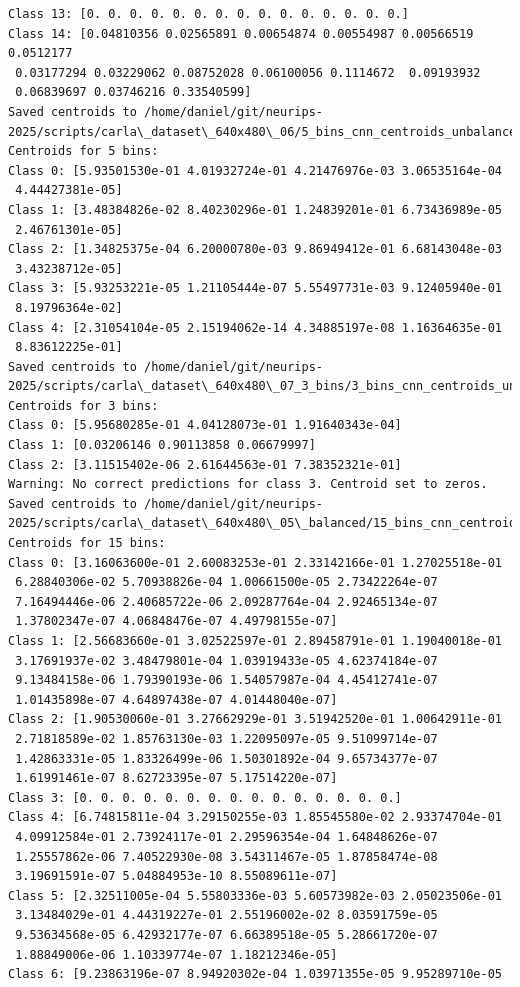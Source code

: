 \begin{verbatim}
Class 13: [0. 0. 0. 0. 0. 0. 0. 0. 0. 0. 0. 0. 0. 0. 0.]
Class 14: [0.04810356 0.02565891 0.00654874 0.00554987 0.00566519 0.0512177
 0.03177294 0.03229062 0.08752028 0.06100056 0.1114672  0.09193932
 0.06839697 0.03746216 0.33540599]
Saved centroids to /home/daniel/git/neurips-2025/scripts/carla\_dataset\_640x480\_06/5_bins_cnn_centroids_unbalanced.npy
Centroids for 5 bins:
Class 0: [5.93501530e-01 4.01932724e-01 4.21476976e-03 3.06535164e-04
 4.44427381e-05]
Class 1: [3.48384826e-02 8.40230296e-01 1.24839201e-01 6.73436989e-05
 2.46761301e-05]
Class 2: [1.34825375e-04 6.20000780e-03 9.86949412e-01 6.68143048e-03
 3.43238712e-05]
Class 3: [5.93253221e-05 1.21105444e-07 5.55497731e-03 9.12405940e-01
 8.19796364e-02]
Class 4: [2.31054104e-05 2.15194062e-14 4.34885197e-08 1.16364635e-01
 8.83612225e-01]
Saved centroids to /home/daniel/git/neurips-2025/scripts/carla\_dataset\_640x480\_07_3_bins/3_bins_cnn_centroids_unbalanced.npy
Centroids for 3 bins:
Class 0: [5.95680285e-01 4.04128073e-01 1.91640343e-04]
Class 1: [0.03206146 0.90113858 0.06679997]
Class 2: [3.11515402e-06 2.61644563e-01 7.38352321e-01]
Warning: No correct predictions for class 3. Centroid set to zeros.
Saved centroids to /home/daniel/git/neurips-2025/scripts/carla\_dataset\_640x480\_05\_balanced/15_bins_cnn_centroids\_balanced.npy
Centroids for 15 bins:
Class 0: [3.16063600e-01 2.60083253e-01 2.33142166e-01 1.27025518e-01
 6.28840306e-02 5.70938826e-04 1.00661500e-05 2.73422264e-07
 7.16494446e-06 2.40685722e-06 2.09287764e-04 2.92465134e-07
 1.37802347e-07 4.06848476e-07 4.49798155e-07]
Class 1: [2.56683660e-01 3.02522597e-01 2.89458791e-01 1.19040018e-01
 3.17691937e-02 3.48479801e-04 1.03919433e-05 4.62374184e-07
 9.13484158e-06 1.79390193e-06 1.54057987e-04 4.45412741e-07
 1.01435898e-07 4.64897438e-07 4.01448040e-07]
Class 2: [1.90530060e-01 3.27662929e-01 3.51942520e-01 1.00642911e-01
 2.71818589e-02 1.85763130e-03 1.22095097e-05 9.51099714e-07
 1.42863331e-05 1.83326499e-06 1.50301892e-04 9.65734377e-07
 1.61991461e-07 8.62723395e-07 5.17514220e-07]
Class 3: [0. 0. 0. 0. 0. 0. 0. 0. 0. 0. 0. 0. 0. 0. 0.]
Class 4: [6.74815811e-04 3.29150255e-03 1.85545580e-02 2.93374704e-01
 4.09912584e-01 2.73924117e-01 2.29596354e-04 1.64848626e-07
 1.25557862e-06 7.40522930e-08 3.54311467e-05 1.87858474e-08
 3.19691591e-07 5.04884953e-10 8.55089611e-07]
Class 5: [2.32511005e-04 5.55803336e-03 5.60573982e-03 2.05023506e-01
 3.13484029e-01 4.44319227e-01 2.55196002e-02 8.03591759e-05
 9.53634568e-05 6.42932177e-07 6.66389518e-05 5.28661720e-07
 1.88849006e-06 1.10339774e-07 1.18212346e-05]
Class 6: [9.23863196e-07 8.94920302e-04 1.03971355e-05 9.95289710e-05

\end{verbatim}
